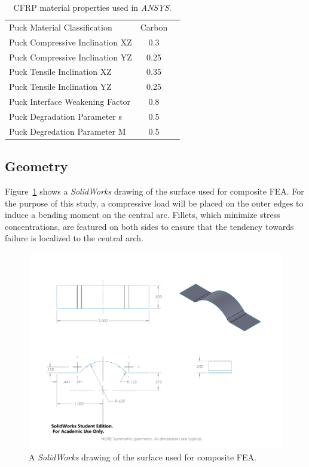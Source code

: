 \begin{table}[htp]
\begin{tabular}{lcc}
        Puck Material Classification & Carbon &\\
        Puck Compressive Inclination XZ & 0.3 &\\
        Puck Compressive Inclination YZ & 0.25 &\\
        Puck Tensile Inclination XZ & 0.35 &\\
        Puck Tensile Inclination YZ & 0.25 &\\
        
        Puck Interface Weakening Factor & 0.8 &\\
        Puck Degradation Parameter s & 0.5 &\\
        Puck Degredation Parameter M & 0.5 &\\
              
        
    \end{tabular}
    \caption{CFRP material properties used in \textit{ANSYS}.}
    \label{tab:ansys-material-properties}
\end{table}

\clearpage

\subsection{Geometry}

\indent

Figure~\ref{fig:fea-surface-geometry} shows a \textit{SolidWorks} drawing of the surface used for composite FEA. For the purpose of this study, a compressive load will be placed on the outer edges to induce a bending moment on the central arc. Fillets, which minimize stress concentrations, are featured on both sides to ensure that the tendency towards failure is localized to the central arch.\\

\begin{figure}[htp]
\centering
\includegraphics[width=1\textwidth]{./figures/fea/fea-surface-geometry}
\caption{A \emph{SolidWorks} drawing of the surface used for composite FEA.}
\label{fig:fea-surface-geometry}
\end{figure}

